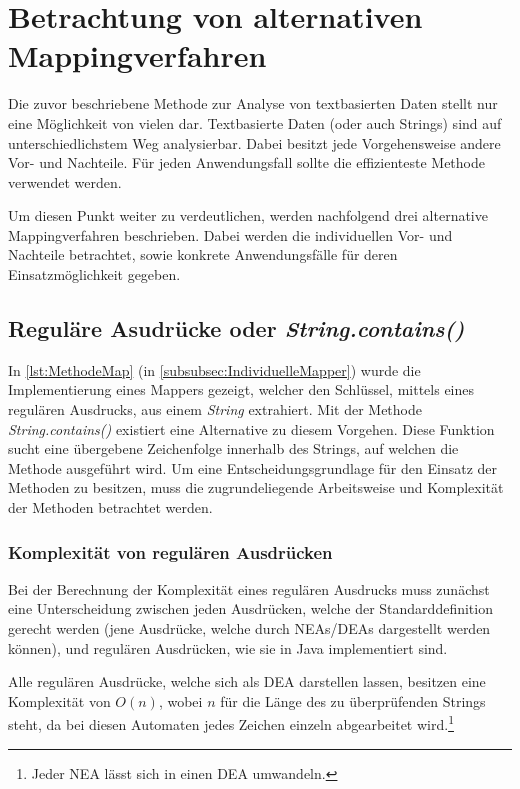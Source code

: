 \section{Betrachtung von alternativen Mappingverfahren}
Die zuvor beschriebene Methode zur Analyse von textbasierten Daten stellt nur eine Möglichkeit von vielen dar. Textbasierte Daten (oder auch Strings) sind auf unterschiedlichstem Weg analysierbar. Dabei besitzt jede Vorgehensweise andere Vor- und Nachteile. Für jeden Anwendungsfall sollte die effizienteste Methode verwendet werden.

Um diesen Punkt weiter zu verdeutlichen, werden nachfolgend drei alternative Mappingverfahren beschrieben. Dabei werden die individuellen Vor- und Nachteile betrachtet, sowie konkrete Anwendungsfälle für deren Einsatzmöglichkeit gegeben. 

\subsection{Reguläre Asudrücke oder \textit{String.contains()}}\label{subsec:Contains}
In \autoref{lst:MethodeMap} (in \autoref{subsubsec:IndividuelleMapper}) wurde die Implementierung eines Mappers gezeigt, welcher den Schlüssel, mittels eines regulären Ausdrucks, aus einem \textit{String} extrahiert. Mit der Methode \textit{String.contains()} existiert eine Alternative zu diesem Vorgehen. Diese Funktion sucht eine übergebene Zeichenfolge innerhalb des Strings, auf welchen die Methode ausgeführt wird. Um eine Entscheidungsgrundlage für den Einsatz der Methoden zu besitzen, muss die zugrundeliegende Arbeitsweise und Komplexität der Methoden betrachtet werden.

\subsubsection{Komplexität von regulären Ausdrücken}
Bei der Berechnung der Komplexität eines regulären Ausdrucks muss zunächst eine Unterscheidung zwischen jeden Ausdrücken, welche der Standarddefinition gerecht werden (jene Ausdrücke, welche durch {\color{LinkColor}\acsp{NEA}}/{\color{LinkColor}\acsp{DEA}} dargestellt werden können), und regulären Ausdrücken, wie sie in Java implementiert sind.

Alle regulären Ausdrücke, welche sich als \acs{DEA} darstellen lassen, besitzen eine Komplexität von $O(n)$, wobei $n$ für die Länge des zu überprüfenden Strings steht, da bei diesen Automaten jedes Zeichen einzeln abgearbeitet wird.\footnote{Jeder \acs{NEA} lässt sich in einen \acs{DEA} umwandeln.}

